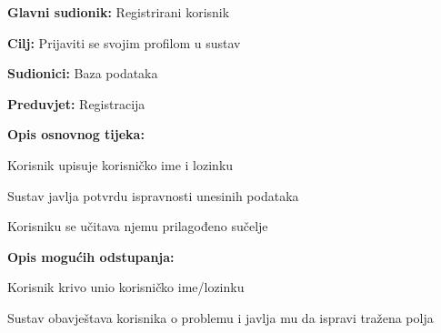 					\noindent {}
					\begin{packed_item}
	
						\item \textbf{Glavni sudionik: }Registrirani korisnik
						\item  \textbf{Cilj:} Prijaviti se svojim profilom u sustav
						\item  \textbf{Sudionici:} Baza podataka
						\item  \textbf{Preduvjet:} Registracija
						\item  \textbf{Opis osnovnog tijeka:}
						
						\item[] \begin{packed_enum}
	
							\item Korisnik upisuje korisničko ime i lozinku 
							\item Sustav javlja potvrdu ispravnosti unesinih podataka
							\item Korisniku se učitava njemu prilagođeno sučelje
						\end{packed_enum}
						
						\item  \textbf{Opis mogućih odstupanja:}
						
						\item[] \begin{packed_item}
	
							\item[1.a] Korisnik krivo unio korisničko ime/lozinku
							\item[] \begin{packed_enum}
								
								\item Sustav obavještava korisnika o problemu i javlja mu da ispravi tražena polja
								
								
							\end{packed_enum}
							
						\end{packed_item}
					\end{packed_item}
					
					\pagebreak
					
